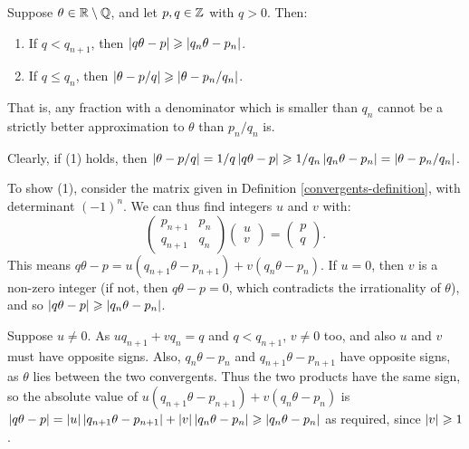 \documentclass{article}
\begin{document}
\begin{theorem}
	\label{rational-approximation-theorem}
    Suppose $\theta \in \mathbb{R} \setminus \mathbb{Q}$, and let $p, q \in \mathbb{Z}$ with $q > 0$. Then:
    \begin{enumerate}
	    \item If $q < q_{n+1}$, then $\left\lvert q \theta - p \right\rvert \geqslant \left\lvert q_n \theta - p_n \right\rvert$.
	    \item If $q \leq q_n$, then $\left\lvert \theta - p/q \right\rvert \geqslant \left\lvert \theta - p_n/q_n \right\rvert$.
	\end{enumerate}
	That is, any fraction with a denominator which is smaller than $q_n$ cannot be a strictly better approximation to $\theta$ than $p_n/q_n$ is.
\end{theorem}

\begin{prf}
    Clearly, if (1) holds, then $\left\lvert \theta - p/q \right\rvert = 1/q \left\lvert q\theta - p \right\rvert \geqslant 1/q_n\left\lvert q_n\theta - p_n \right\rvert = \left\lvert \theta - p_n/q_n \right\rvert$.
    
    To show (1), consider the matrix given in Definition \ref{convergents-definition}, with  determinant $(-1)^n$. We can thus find integers $u$ and $v$ with:
    \[
	\begin{pmatrix}
		p_{n+1} & p_n \\ q_{n+1} & q_n
	\end{pmatrix}
	\begin{pmatrix}
		u \\ v
	\end{pmatrix}
	=
	\begin{pmatrix}
		p \\ q
	\end{pmatrix}.
	\]
	This means $q \theta - p = u(q_{n+1}\theta - p_{n+1}) + v(q_{n} \theta - p_n)$. If $u = 0$, then $v$ is a non-zero integer (if not, then $q\theta - p = 0$, which contradicts the irrationality of $\theta$), and so $\left\lvert q \theta - p \right\rvert \geqslant \left\lvert q_n \theta - p_n \right\rvert$.
	
	Suppose $u \neq 0$. As $u q_{n+1} + v q_n = q$ and $q < q_{n+1}$, $v \neq 0$ too, and also $u$ and $v$ must have opposite signs. Also, $q_n \theta - p_n$ and $q_{n+1} \theta - p_{n+1}$ have opposite signs, as $\theta$ lies between the two convergents. Thus the two products have the same sign, so the absolute value of $u(q_{n+1}\theta - p_{n+1}) + v(q_{n} \theta - p_n)$ is $\left\lvert q \theta - p \right\rvert = \left\lvert u \right\rvert \left\lvert q_{n+1} \theta - p_{n+1} \right\rvert + \left\lvert v \right\rvert \left\lvert q_{n} \theta - p_{n} \right\rvert \geqslant  \left\lvert q_{n} \theta - p_{n} \right\rvert$ as required, since $\left\lvert v \right\rvert \geqslant 1$.
\end{prf}
\end{document}
